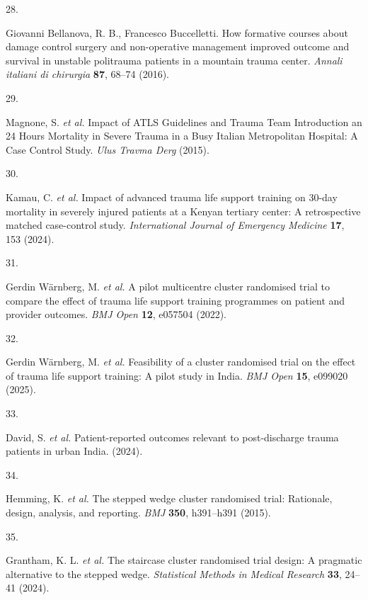\documentclass[
]{scrartcl}
\newlength{\cslhangindent}
\newlength{\csllabelwidth}
\newenvironment{CSLReferences}[2] %
 {\begin{list}{}{%
  \setlength{\itemindent}{0pt}
  \setlength{\leftmargin}{0pt}
  \setlength{\parsep}{0pt}
  \ifodd #1
   \setlength{\leftmargin}{\cslhangindent}
   \setlength{\itemindent}{-1\cslhangindent}
  \fi
  \setlength{\itemsep}{#2\baselineskip}}}
 {\end{list}}
\newcommand{\CSLLeftMargin}[1]{\parbox[t]{\csllabelwidth}{\strut#1\strut}}
\newcommand{\CSLRightInline}[1]{\parbox[t]{\linewidth - \csllabelwidth}{\strut#1\strut}}
\begin{document}
\begin{CSLReferences}{0}{0}
\CSLLeftMargin{28. }%
\CSLRightInline{Giovanni Bellanova, R. B., Francesco Buccelletti. How
formative courses about damage control surgery and non-operative
management improved outcome and survival in unstable politrauma patients
in a mountain trauma center. \emph{Annali italiani di chirurgia}
\textbf{87}, 68--74 (2016).}

\CSLLeftMargin{29. }%
\CSLRightInline{Magnone, S. \emph{et al.} Impact of {ATLS} {Guidelines}
and {Trauma} {Team} {Introduction} an 24 {Hours} {Mortality} in {Severe}
{Trauma} in a {Busy} {Italian} {Metropolitan} {Hospital}: A {Case}
{Control} {Study}. \emph{Ulus Travma Derg} (2015).}

\CSLLeftMargin{30. }%
\CSLRightInline{Kamau, C. \emph{et al.} Impact of advanced trauma life
support training on 30-day mortality in severely injured patients at a
{Kenyan} tertiary center: A retrospective matched case-control study.
\emph{International Journal of Emergency Medicine} \textbf{17}, 153
(2024).}

\CSLLeftMargin{31. }%
\CSLRightInline{Gerdin Wärnberg, M. \emph{et al.} A pilot multicentre
cluster randomised trial to compare the effect of trauma life support
training programmes on patient and provider outcomes. \emph{BMJ Open}
\textbf{12}, e057504 (2022).}

\CSLLeftMargin{32. }%
\CSLRightInline{Gerdin Wärnberg, M. \emph{et al.} Feasibility of a
cluster randomised trial on the effect of trauma life support training:
A pilot study in {India}. \emph{BMJ Open} \textbf{15}, e099020 (2025).}

\CSLLeftMargin{33. }%
\CSLRightInline{David, S. \emph{et al.} Patient-reported outcomes
relevant to post-discharge trauma patients in urban {India}. (2024).}

\CSLLeftMargin{34. }%
\CSLRightInline{Hemming, K. \emph{et al.} The stepped wedge cluster
randomised trial: Rationale, design, analysis, and reporting. \emph{BMJ}
\textbf{350}, h391--h391 (2015).}

\CSLLeftMargin{35. }%
\CSLRightInline{Grantham, K. L. \emph{et al.} The staircase cluster
randomised trial design: {A} pragmatic alternative to the stepped wedge.
\emph{Statistical Methods in Medical Research} \textbf{33}, 24--41
(2024).}


\end{CSLReferences}
\end{document}
